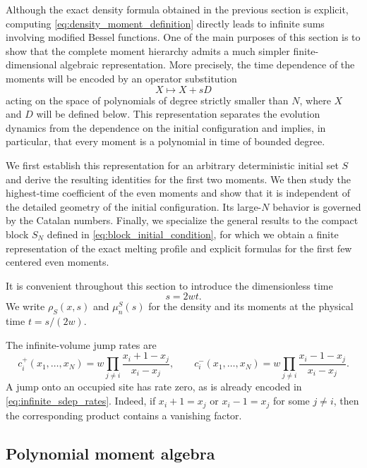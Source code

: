 \documentclass[11pt]{article}
\numberwithin{equation}{section}
\newcommand{\1}{\mathbf 1}
\begin{document}
Although the exact density formula obtained in the previous section is
explicit, computing \eqref{eq:density_moment_definition} directly leads to
infinite sums involving modified Bessel functions.  One of the main purposes
of this section is to show that the complete moment hierarchy admits a much
simpler finite-dimensional algebraic representation.  More precisely, the
time dependence of the moments will be encoded by an operator substitution
$$
X\longmapsto X+sD
$$
acting on the space of polynomials of degree strictly smaller than $N$, where $X$ and $D$ will be defined below. This
representation separates the evolution dynamics from the dependence on the
initial configuration and implies, in particular, that every moment is a
polynomial in time of bounded degree.

We first establish this representation for an arbitrary deterministic initial
set $S$ and derive the resulting identities for the first two moments.  We
then study the highest-time coefficient of the even moments and show that it
is independent of the detailed geometry of the initial configuration.  Its
large-$N$ behavior is governed by the Catalan numbers. Finally, we specialize the general results to the compact block \(S_N\)
defined in \eqref{eq:block_initial_condition}, for which we obtain a finite
representation of the exact melting profile and explicit formulas for the
first few centered even moments.

It is convenient throughout this section to introduce the dimensionless time
\begin{equation}
s=2wt.
\label{eq:dimensionless_time}
\end{equation}
We write $\rho_S(x,s)$ and $\mu_n^S(s)$ for the density and its moments at the
physical time $t=s/(2w)$.

The infinite-volume jump rates are
\begin{equation}
c_i^+(x_1,\ldots,x_N)
=
w\prod_{j\neq i}
\frac{x_i+1-x_j}{x_i-x_j},
\qquad
c_i^-(x_1,\ldots,x_N)
=
w\prod_{j\neq i}
\frac{x_i-1-x_j}{x_i-x_j}.
\label{eq:infinite_sdep_rates}
\end{equation}
A jump onto an occupied site has rate zero, as is already encoded in
\eqref{eq:infinite_sdep_rates}.  Indeed, if $x_i+1=x_j$ or $x_i-1=x_j$ for
some $j\neq i$, then the corresponding product contains a vanishing factor.


\subsection{Polynomial moment algebra}
\label{sec:polynomial_moment_algebra}
\end{document}
